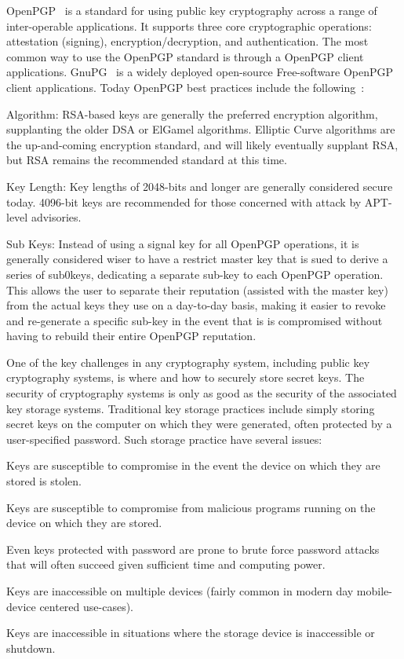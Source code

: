 \documentclass[11pt, twocolumn]{article}
\newenvironment{packed_item}{
\begin{itemize}
  \setlength{\itemsep}{1pt}
  \setlength{\parskip}{0pt}
  \setlength{\parsep}{0pt}
}{\end{itemize}}
\begin{document}
OpenPGP~\cite{openpgp, rfc4880} is a standard for using public key
cryptography across a range of inter-operable applications. It
supports three core cryptographic operations: attestation (signing),
encryption/decryption, and authentication. The most common way to use
the OpenPGP standard is through a OpenPGP client
applications. GnuPG~\cite{gnupg} is a widely deployed open-source
Free-software OpenPGP client applications. Today OpenPGP best
practices include the following~\cite{matt-openpgp}:

\begin{packed_item}
\item{Algorithm:} RSA-based keys are generally the preferred
  encryption algorithm, supplanting the older DSA or ElGamel
  algorithms. Elliptic Curve algorithms are the up-and-coming
  encryption standard, and will likely eventually supplant RSA, but
  RSA remains the recommended standard at this time.
\item{Key Length:} Key lengths of 2048-bits and longer are generally
  considered secure today. 4096-bit keys are recommended for those
  concerned with attack by APT-level advisories.
\item{Sub Keys:} Instead of using a signal key for all OpenPGP
  operations, it is generally considered wiser to have a restrict
  master key that is sued to derive a series of sub0keys, dedicating a
  separate sub-key to each OpenPGP operation. This allows the user to
  separate their reputation (assisted with the master key) from the
  actual keys they use on a day-to-day basis, making it easier to
  revoke and re-generate a specific sub-key in the event that is is
  compromised without having to rebuild their entire OpenPGP
  reputation.
\end{packed_item}

One of the key challenges in any cryptography system, including public
key cryptography systems, is where and how to securely store secret
keys. The security of cryptography systems is only as good as the
security of the associated key storage systems. Traditional key
storage practices include simply storing secret keys on the computer
on which they were generated, often protected by a user-specified
password. Such storage practice have several issues:

\begin{packed_item}
\item Keys are susceptible to compromise in the event the device on
  which they are stored is stolen.
\item Keys are susceptible to compromise from malicious programs
  running on the device on which they are stored.
\item Even keys protected with password are prone to brute force
  password attacks that will often succeed given sufficient time and
  computing power.
\item Keys are inaccessible on multiple devices (fairly common in
  modern day mobile-device centered use-cases).
\item Keys are inaccessible in situations where the storage device is
  inaccessible or shutdown.
\end{packed_item}
\end{document}
